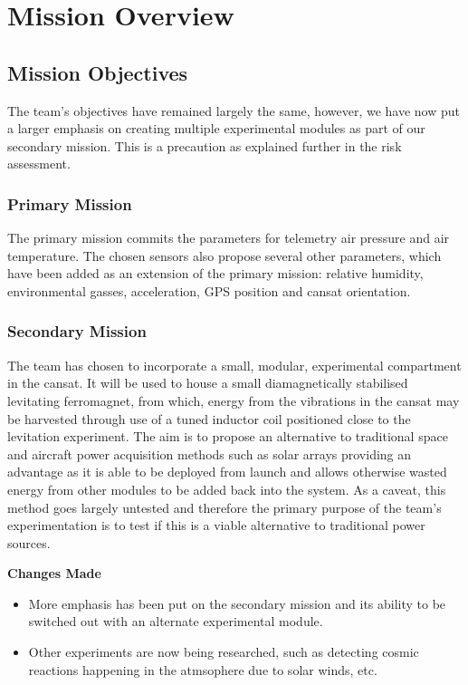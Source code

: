 \documentclass{report}
\begin{document}
	\section{Mission Overview}
		\subsection{Mission Objectives}
		The team's objectives have remained largely the same, however, we have
		now put a larger emphasis on creating multiple experimental modules as part
		of our secondary mission. This is a precaution as explained further in the
		risk assessment.
		
		\subsubsection{Primary Mission}
		The primary mission commits the parameters for telemetry air pressure and
		air temperature. The chosen sensors also propose several other parameters, 
		which have been added as an extension of the primary mission: relative
		humidity, environmental gasses, acceleration, GPS position and cansat
		orientation.

		\subsubsection{Secondary Mission}
		The team has chosen to incorporate a small, modular, experimental
		compartment in the cansat. It will be used to house a small diamagnetically
		stabilised levitating ferromagnet, from which, energy from the vibrations in 
		the cansat may be harvested through use of a tuned inductor coil positioned
		close to the levitation experiment. The aim is to propose an alternative to
		traditional space and aircraft power acquisition methods such as solar arrays
		providing an advantage as it is able to be deployed from launch and allows
		otherwise wasted energy from other modules to be added back into the
		system. As a caveat, this method goes largely untested and therefore the
		primary purpose of the team’s experimentation is to test if this is a viable
		alternative to traditional power sources.\\
		

		{\color{blue} \textbf{Changes Made}
		\begin{itemize}
			\item More emphasis has been put on the secondary mission and its 
			ability to be switched out with an alternate experimental module.
			\item Other experiments are now being researched, such as detecting
			cosmic reactions happening in the atmsophere due to solar winds, etc.
		\end{itemize}
		}
\end{document}

